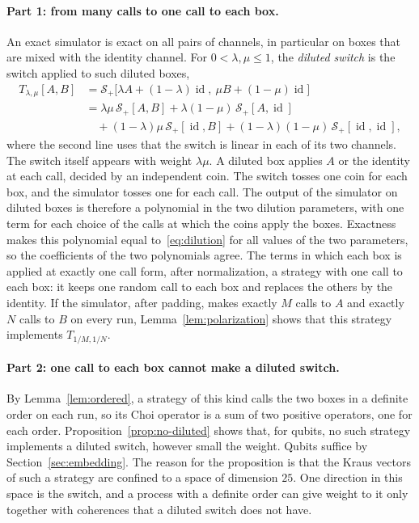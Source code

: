 \documentclass[11pt,letterpaper]{article}
\theoremstyle{definition}\newtheorem{definition}[theorem]{Definition}
\newcommand{\SW}{\mathcal S}
\newcommand{\id}{\operatorname{id}}
\begin{document}
\paragraph{Part 1: from many calls to one call to each box.}
An exact simulator is exact on all pairs of channels, in particular
on boxes that are mixed with the identity channel. For
$0<\lambda,\mu\le1$, the
\emph{diluted switch} is the switch applied to such diluted boxes,
\begin{equation}\label{eq:dilution}
\begin{split}
 T_{\lambda,\mu}[A,B]
 &=\SW_+\bigl[\lambda A+(1-\lambda)\id,\ \mu B+(1-\mu)\id\bigr]\\
  &=\lambda\mu\,\SW_+[A,B]
 +\lambda(1-\mu)\,\SW_+[A,\id]\\
 &\quad+(1-\lambda)\mu\,\SW_+[\id,B]
 +(1-\lambda)(1-\mu)\,\SW_+[\id,\id],
\end{split}
\end{equation}
where the second line uses that the switch is linear in each of its
two channels. The
switch itself appears with weight $\lambda\mu$. A diluted box applies
$A$ or the identity at each call, decided by an independent
coin. The switch tosses one coin for each box, and the simulator
tosses one for each call. The output of the simulator on
diluted boxes is therefore a polynomial in the two dilution parameters,
with one term for each choice of the calls at which the coins apply
the boxes. Exactness makes this polynomial equal
to~\eqref{eq:dilution} for all values of the two parameters, so the
coefficients of the two polynomials agree.
The terms in which each box is applied at exactly one call form, after
normalization, a strategy with one call to each box: it keeps one
random call to each box and replaces the others by the identity. If the simulator,
after padding, makes exactly $M$ calls to $A$ and exactly $N$ calls
to $B$ on every run, Lemma~\ref{lem:polarization} shows that this
strategy implements $T_{1/M,1/N}$.

\paragraph{Part 2: one call to each box cannot make a diluted switch.}
By
Lemma~\ref{lem:ordered}, a strategy of this kind calls the two boxes in
a definite order on each run, so its Choi operator is a sum of two
positive operators, one for each order.
Proposition~\ref{prop:no-diluted} shows that, for qubits, no such
strategy
implements a diluted switch, however small the weight. Qubits suffice
by Section~\ref{sec:embedding}. The reason for the proposition is
that the Kraus vectors of
such a strategy are confined to a space of dimension $25$. One
direction in this space is the switch, and a process with a definite
order can give weight to it only together with coherences that a
diluted switch does not have.
\end{document}
